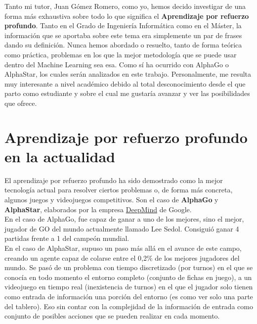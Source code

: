 \documentclass[11pt,fleqn]{book} %
\begin{document}
Tanto mi tutor, Juan Gómez Romero, como yo, hemos decido investigar de una forma más exhaustiva sobre todo lo que significa el \textbf{Aprendizaje por refuerzo profundo}. Tanto en el Grado de Ingeniería Informática como en el Máster, la información que se aportaba sobre este tema era simplemente un par de frases dando su definición. Nunca hemos abordado o resuelto, tanto de forma teórica como práctica, problemas en los que la mejor metodología que se puede usar dentro del Machine Learning sea esa. Como sí ha ocurrido con AlphaGo o AlphaStar, los cuales serán analizados en este trabajo. Personalmente, me resulta muy interesante a nivel académico debido al total desconocimiento desde el que parto como estudiante y sobre el cual me gustaría avanzar y ver las posibilidades que ofrece.

\section{Aprendizaje por refuerzo profundo en la actualidad}\label{sec:DRL2}

El aprendizaje por refuerzo profundo ha sido demostrado como la mejor tecnología actual para resolver ciertos problemas o, de forma más concreta, algunos juegos y videojuegos competitivos. Son el caso de \textbf{AlphaGo} y \textbf{AlphaStar}, elaborados por la empresa \href{https://deepmind.com/}{DeepMind} de Google.\cite{article:DeepMind} \\

En el caso de AlphaGo, fue capaz de ganar a uno de los mejores, sino el mejor, jugador de GO del mundo actualmente llamado Lee Sedol. Consiguió ganar 4 partidas frente a 1 del campeón mundial.\cite{article:leesedol} \cite{article:leesedol2} \\

En el caso de AlphaStar, supuso un paso más allá en el avance de este campo, creando un agente capaz de colarse entre el 0,2\% de los mejores jugadores del mundo. Se pasó de un problema con tiempo discretizado (por turnos) en el que se conocía en todo momento el entorno completo (conjunto de fichas en juego), a un videojuego en tiempo real (inexistencia de turnos) en el que el jugador solo tienen como entrada de información una porción del entorno (es como ver solo una parte del tablero). Eso sin contar con la complejidad de la información de entrada como conjunto de posibles acciones que se pueden realizar en cada momento.\cite{article:vinyals} \cite{article:vinyals2} \\
\end{document}
